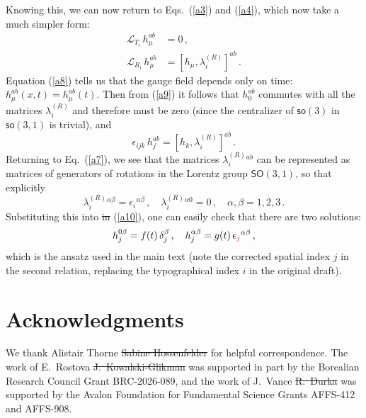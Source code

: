 \documentclass[11pt, a4paper]{article}
\newcommand{\lang}[1]{\textcolor{langfix}{#1}}
\newcommand{\subst}[1]{\textcolor{substantive}{#1}}
\newcommand{\rem}[1]{\textcolor{removeprop}{\sout{#1}}}
\def\SO{\mathsf{SO}}
\def\so{\mathsf{so}}
\begin{document}
Knowing this, we can now return to Eqs.\ (\ref{a3}) and (\ref{a4}), which now take a much simpler form:
\begin{align}
\mathcal{L}_{T_i}\,h_\mu^{ab} &= 0\,,\label{a8}\\
\mathcal{L}_{R_i}\,h_\mu^{ab} &= [h_\mu,\lambda^{(R)}_i]^{ab}\,.\label{a9}
\end{align}
Equation (\ref{a8}) tells \lang{us} that the gauge field depends only on time: $h_\mu^{ab}(x,t) = h_\mu^{ab}(t)$. Then from (\ref{a9}) it follows that $h_0^{ab}$ commutes with all the matrices $\lambda^{(R)}_i$ and therefore must be zero \subst{(since the centralizer of $\so(3)$ in $\so(3,1)$ is trivial)}, and
\begin{equation}\label{a10}
\epsilon_{ijk}\, h_j^{ab}=[h_k,\lambda^{(R)}_i]^{ab}\,.
\end{equation}
Returning to Eq.\ (\ref{a7}), we see that the matrices $\lambda^{(R)}_i{}^{ab}$ can be represented as matrices of generators of rotations in the Lorentz group $\SO(3,1)$, so that explicitly
\begin{equation}\label{a11}
\lambda^{(R)}_i{}^{\alpha\beta} = \epsilon_i{}^{\alpha\beta}\,, \quad \lambda^{(R)}_i{}^{\alpha0} =0\,, \quad \alpha,\beta=1,2,3\,.
\end{equation}
Substituting this \lang{into} \rem{in} (\ref{a10}), one can easily check that there are two solutions:
\begin{equation}\label{a12}
h_j^{0\beta} =f(t) \, \delta_j^\beta\,, \quad h_j^{\alpha\beta} = g(t)\, \epsilon_{\subst{j}}{}^{\alpha\beta}\,,
\end{equation}
which is the ansatz used in the main text \subst{(note the corrected spatial index $j$ in the second relation, replacing the typographical index $i$ in the original draft)}.

\section*{Acknowledgments}
We thank \subst{Alistair Thorne} \rem{Sabine Hossenfelder} for helpful correspondence. The work of \subst{E.~Rostova} \rem{J.~Kowalski-Glikman} was supported in part by the \subst{Borealian Research Council Grant BRC-2026-089}, and the work of \subst{J.~Vance} \rem{R.~Durka} was supported by the \subst{Avalon Foundation for Fundamental Science Grants AFFS-412 and AFFS-908}.
\end{document}
